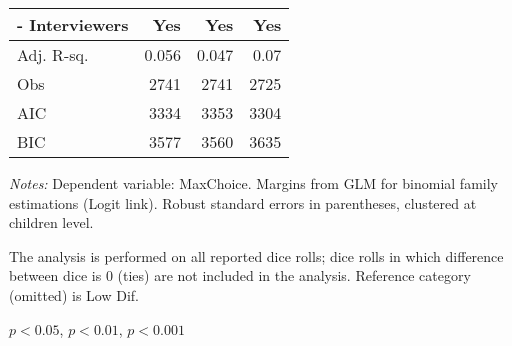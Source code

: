 \begin{table}[htbp]
\begin{threeparttable}
\begin{tabular}{l*{3}{D{.}{.}{-1}}}
- Interviewers &                 Yes   &                 Yes   &                 Yes   \\
\midrule
Adj. R-sq.          &               0.056   &             0.047     &         0.07           \\
Obs                 &                2741   &                2741   &                2725   \\
AIC                 &                3334   &                3353   &                3304   \\
BIC                 &                3577   &                3560   &                3635   \\  
\bottomrule
\end{tabular}
\begin{tablenotes}
\footnotesize
\textit{Notes:} Dependent variable: MaxChoice. Margins from GLM for binomial family estimations (Logit link). Robust standard errors in parentheses, clustered at children level. \\
\item The analysis is performed on all reported dice rolls; dice rolls in which difference between dice is 0 (ties) are not included in the analysis. Reference category (omitted) is Low Dif. \\
\item \sym{*} \(p<0.05\), \sym{**} \(p<0.01\), \sym{***} \(p<0.001\)
\end{tablenotes}
\end{threeparttable}
\label{tab:cheat_patterns}
\end{table}
